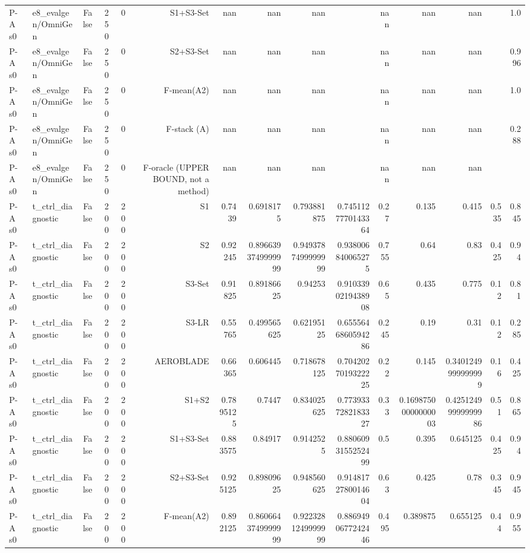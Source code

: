 \begin{table}[htbp]
\begin{tabular}{llrrrrrrrrrrrrr}
P-A s0 & e8\_evalgen/OmniGen & False & 250 & 0 & S1+S3-Set & nan & nan & nan &  & nan & nan & nan &  & 1.0 \\
P-A s0 & e8\_evalgen/OmniGen & False & 250 & 0 & S2+S3-Set & nan & nan & nan &  & nan & nan & nan &  & 0.996 \\
P-A s0 & e8\_evalgen/OmniGen & False & 250 & 0 & F-mean(A2) & nan & nan & nan &  & nan & nan & nan &  & 1.0 \\
P-A s0 & e8\_evalgen/OmniGen & False & 250 & 0 & F-stack (A) & nan & nan & nan &  & nan & nan & nan &  & 0.288 \\
P-A s0 & e8\_evalgen/OmniGen & False & 250 & 0 & F-oracle (UPPER BOUND, not a method) & nan & nan & nan &  & nan & nan & nan &  &  \\
P-A s0 & t\_ctrl\_diagnostic & False & 200 & 200 & S1 & 0.7439 & 0.6918175 & 0.793881875 & 0.7451127770143364 & 0.27 & 0.135 & 0.415 & 0.535 & 0.845 \\
P-A s0 & t\_ctrl\_diagnostic & False & 200 & 200 & S2 & 0.92245 & 0.8966393749999999 & 0.9493787499999999 & 0.938006840065275 & 0.755 & 0.64 & 0.83 & 0.425 & 0.94 \\
P-A s0 & t\_ctrl\_diagnostic & False & 200 & 200 & S3-Set & 0.91825 & 0.89186625 & 0.94253 & 0.9103390219438908 & 0.65 & 0.435 & 0.775 & 0.12 & 0.81 \\
P-A s0 & t\_ctrl\_diagnostic & False & 200 & 200 & S3-LR & 0.55765 & 0.499565625 & 0.62195125 & 0.6555646860594286 & 0.245 & 0.19 & 0.31 & 0.12 & 0.285 \\
P-A s0 & t\_ctrl\_diagnostic & False & 200 & 200 & AEROBLADE & 0.66365 & 0.606445 & 0.718678125 & 0.7042027019322225 & 0.22 & 0.145 & 0.3401249999999999 & 0.16 & 0.425 \\
P-A s0 & t\_ctrl\_diagnostic & False & 200 & 200 & S1+S2 & 0.7895125 & 0.7447 & 0.834025625 & 0.7739337282183327 & 0.33 & 0.16987500000000003 & 0.42512499999999986 & 0.51 & 0.865 \\
P-A s0 & t\_ctrl\_diagnostic & False & 200 & 200 & S1+S3-Set & 0.883575 & 0.84917 & 0.9142525 & 0.8806093155252499 & 0.5 & 0.395 & 0.645125 & 0.425 & 0.94 \\
P-A s0 & t\_ctrl\_diagnostic & False & 200 & 200 & S2+S3-Set & 0.925125 & 0.89809625 & 0.948560625 & 0.9148172780014604 & 0.63 & 0.425 & 0.78 & 0.345 & 0.945 \\
P-A s0 & t\_ctrl\_diagnostic & False & 200 & 200 & F-mean(A2) & 0.892125 & 0.8606643749999999 & 0.9223281249999999 & 0.8869490677242446 & 0.495 & 0.389875 & 0.655125 & 0.44 & 0.955 \\

\end{tabular}
\end{table}
